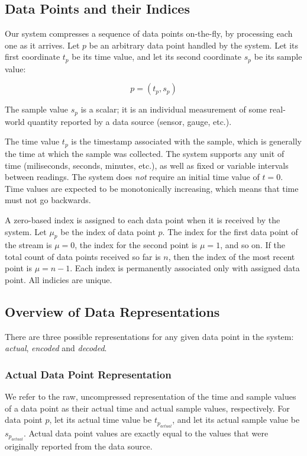 \documentclass{article}
\begin{document}
\subsection{Data Points and their Indices}
Our system compresses a sequence of data points on-the-fly, by processing each one as it arrives. Let \(p\) be an arbitrary data point handled by the system. Let its first coordinate \(t_p\) be its time value, and let its second coordinate \(s_p\) be its sample value:

\[ p = (t_p, s_p) \]

The sample value \(s_p\) is a scalar; it is an individual measurement of some real-world quantity reported by a data source (sensor, gauge, etc.).

The time value \(t_p\) is the timestamp associated with the sample, which is generally the time at which the sample was collected. The system supports any unit of time (miliseconds, seconds, minutes, etc.), as well as fixed or variable intervals between readings. The system does \textit{not} require an initial time value of \(t = 0\). Time values are expected to be monotonically increasing, which means that time must not go backwards.

A zero-based index is assigned to each data point when it is received by the system. Let \(\mu_p\) be the index of data point \(p\).
The index for the first data point of the stream is \(\mu = 0\), the index for the second point is \(\mu = 1\), and so on. If the total count of data points received so far is \(n\), then the index of the most recent point is \(\mu = n-1\). Each index is permanently associated only with assigned data point. All indicies are unique.

\subsection{Overview of Data Representations}
There are three possible representations for any given data point in the system: \textit{actual}, \textit{encoded} and \textit{decoded}.
\subsubsection{Actual Data Point Representation}
We refer to the raw, uncompressed representation of the time and sample values of a data point as their actual time and actual sample values, respectively.
For data point \(p\), let its actual time value be \(t_{p_{actual}}\), and let its actual sample value be \(s_{p_{actual}}\). Actual data point values are exactly equal to the values that were originally reported from the data source.
\end{document}
